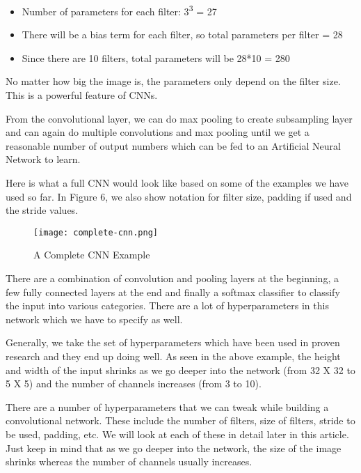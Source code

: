 \begin{itemize}
  \item Number of parameters for each filter: 3\textsuperscript{3} = 27
  \item There will be a bias term for each filter, so total parameters per filter = 28
  \item Since there are 10 filters, total parameters will be 28*10 = 280
\end{itemize}

No matter how big the image is, the parameters only depend on the filter size. This is a powerful feature of CNNs.
\par
From the convolutional layer, we can do max pooling to create subsampling layer and can again do multiple convolutions and max pooling until we get a reasonable number of output numbers which can be fed to an Artificial Neural Network to learn.
\par
Here is what a full CNN would look like based on some of the examples we have used so far. In Figure 6, we also show notation for filter size, padding if used and the stride values.

\begin{figure}
  \caption{A Complete CNN Example}
  \texttt{[image: complete-cnn.png]}
\end{figure}

There are a combination of convolution and pooling layers at the beginning, a few fully connected layers at the end and finally a softmax classifier to classify the input into various categories. There are a lot of hyperparameters in this network which we have to specify as well.
\par
Generally, we take the set of hyperparameters which have been used in proven research and they end up doing well. As seen in the above example, the height and width of the input shrinks as we go deeper into the network (from 32 X 32 to 5 X 5) and the number of channels increases (from 3 to 10).
\par
There are a number of hyperparameters that we can tweak while building a convolutional network.
These include the number of filters, size of filters, stride to be used, padding, etc. We will look at each of these in detail later in this article. Just keep in mind that as we go deeper into the network, the size of the image shrinks whereas the number of channels usually increases.
